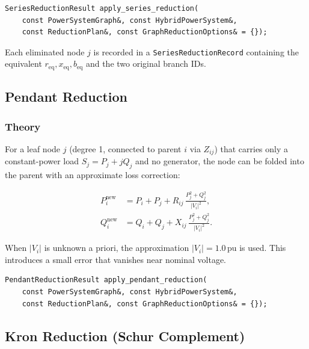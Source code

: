\begin{verbatim}
SeriesReductionResult apply_series_reduction(
    const PowerSystemGraph&, const HybridPowerSystem&,
    const ReductionPlan&, const GraphReductionOptions& = {});
\end{verbatim}

Each eliminated node $j$ is recorded in a \texttt{SeriesReductionRecord}
containing the equivalent $r_{\text{eq}}, x_{\text{eq}}, b_{\text{eq}}$ and
the two original branch IDs.

\subsection{Pendant Reduction}
\label{sec:graph-pendant}

\subsubsection{Theory}

For a leaf node $j$ (degree 1, connected to parent $i$ via $Z_{ij}$) that
carries only a constant-power load $S_j = P_j + jQ_j$ and no generator, the
node can be folded into the parent with an approximate loss correction:

\begin{align}
  P_i^{\text{new}} &= P_i + P_j + R_{ij}\,\frac{P_j^2 + Q_j^2}{|V_i|^2}, \\
  Q_i^{\text{new}} &= Q_i + Q_j + X_{ij}\,\frac{P_j^2 + Q_j^2}{|V_i|^2}.
\end{align}

When $|V_i|$ is unknown a priori, the approximation $|V_i| = 1.0\,\text{pu}$
is used.  This introduces a small error that vanishes near nominal voltage.

\begin{verbatim}
PendantReductionResult apply_pendant_reduction(
    const PowerSystemGraph&, const HybridPowerSystem&,
    const ReductionPlan&, const GraphReductionOptions& = {});
\end{verbatim}

\subsection{Kron Reduction (Schur Complement)}
\label{sec:graph-kron}

